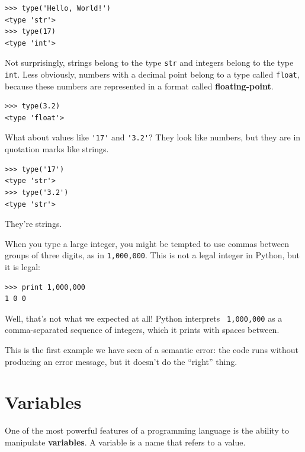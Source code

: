 \documentclass[10pt]{book}
\begin{document}
\beforeverb
\begin{verbatim}
>>> type('Hello, World!')
<type 'str'>
>>> type(17)
<type 'int'>
\end{verbatim}
\afterverb
%
Not surprisingly, strings belong to the type {\tt str} and
integers belong to the type {\tt int}.  Less obviously, numbers
with a decimal point belong to a type called {\tt float},
because these numbers are represented in a
format called {\bf floating-point}.


\beforeverb
\begin{verbatim}
>>> type(3.2)
<type 'float'>
\end{verbatim}
\afterverb
%
What about values like \verb"'17'" and \verb"'3.2'"?
They look like numbers, but they are in quotation marks like
strings.


\beforeverb
\begin{verbatim}
>>> type('17')
<type 'str'>
>>> type('3.2')
<type 'str'>
\end{verbatim}
\afterverb
%
They're strings.

When you type a large integer, you might be tempted to use commas
between groups of three digits, as in {\tt 1,000,000}.  This is not a
legal integer in Python, but it is legal:

\beforeverb
\begin{verbatim}
>>> print 1,000,000
1 0 0
\end{verbatim}
\afterverb
%
Well, that's not what we expected at all!  Python interprets {\tt
  1,000,000} as a comma-separated sequence of integers, which it
prints with spaces between.


This is the first example we have seen of a semantic error: the code
runs without producing an error message, but it doesn't do the
``right'' thing.


\section{Variables}

One of the most powerful features of a programming language is the
ability to manipulate {\bf variables}.  A variable is a name that
refers to a value.
\end{document}
